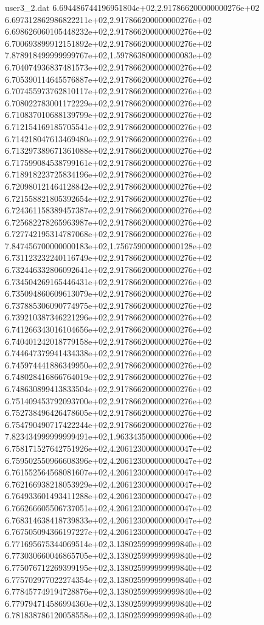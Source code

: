 \begin{filecontents}{user3_2.dat}
6.694486744196951804e+02,2.917866200000000276e+02
6.697312862986822211e+02,2.917866200000000276e+02
6.698626060105448232e+02,2.917866200000000276e+02
6.700693899912151892e+02,2.917866200000000276e+02
7.878918499999999767e+02,1.597863800000000083e+02
6.704074936837481573e+02,2.917866200000000276e+02
6.705390114645576887e+02,2.917866200000000276e+02
6.707455973762810117e+02,2.917866200000000276e+02
6.708022783001172229e+02,2.917866200000000276e+02
6.710837010688139799e+02,2.917866200000000276e+02
6.712154169185705541e+02,2.917866200000000276e+02
6.714218047613469480e+02,2.917866200000000276e+02
6.713297389671361088e+02,2.917866200000000276e+02
6.717599084538799161e+02,2.917866200000000276e+02
6.718918223725834196e+02,2.917866200000000276e+02
6.720980121464128842e+02,2.917866200000000276e+02
6.721558821805392654e+02,2.917866200000000276e+02
6.724361158389457387e+02,2.917866200000000276e+02
6.725682278265963987e+02,2.917866200000000276e+02
6.727742195314787068e+02,2.917866200000000276e+02
7.847456700000000183e+02,1.756759000000000128e+02
6.731123232240116749e+02,2.917866200000000276e+02
6.732446332806092641e+02,2.917866200000000276e+02
6.734504269165446431e+02,2.917866200000000276e+02
6.735094860609613079e+02,2.917866200000000276e+02
6.737885306090774975e+02,2.917866200000000276e+02
6.739210387346221296e+02,2.917866200000000276e+02
6.741266343016104656e+02,2.917866200000000276e+02
6.740401242018779158e+02,2.917866200000000276e+02
6.744647379941434338e+02,2.917866200000000276e+02
6.745974441886349950e+02,2.917866200000000276e+02
6.748028416866764019e+02,2.917866200000000276e+02
6.748630899413833504e+02,2.917866200000000276e+02
6.751409453792093700e+02,2.917866200000000276e+02
6.752738496426478605e+02,2.917866200000000276e+02
6.754790490717422244e+02,2.917866200000000276e+02
7.823434999999999491e+02,1.963343500000000006e+02
6.758171527642751926e+02,4.206123000000000047e+02
6.759502550966608396e+02,4.206123000000000047e+02
6.761552564568081607e+02,4.206123000000000047e+02
6.762166938218053929e+02,4.206123000000000047e+02
6.764933601493411288e+02,4.206123000000000047e+02
6.766266605506737051e+02,4.206123000000000047e+02
6.768314638418739833e+02,4.206123000000000047e+02
6.767505094366197227e+02,4.206123000000000047e+02
6.771695675344069514e+02,3.138025999999999840e+02
6.773030660046865705e+02,3.138025999999999840e+02
6.775076712269399195e+02,3.138025999999999840e+02
6.775702977022274354e+02,3.138025999999999840e+02
6.778457749194728876e+02,3.138025999999999840e+02
6.779794714586994360e+02,3.138025999999999840e+02
6.781838786120058558e+02,3.138025999999999840e+02

\end{filecontents}

